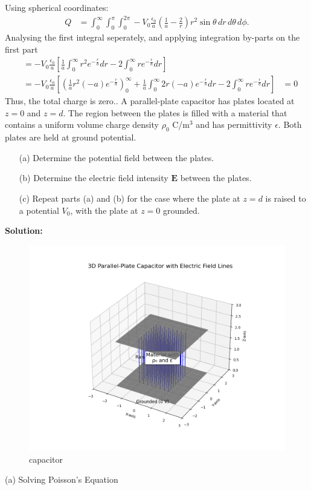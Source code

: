 \documentclass{article}
\begin{document}
Using spherical coordinates:
\begin{align*}
Q &= \int_{0}^{\infty} \int_{0}^{\pi} \int_{0}^{2\pi} -V_0 \frac{\epsilon_0}{a} 
\left( \frac{1}{a} - \frac{2}{r} \right) r^2 \sin\theta \, dr \, d\theta \, d\phi.
\end{align*}
Analysing the first integral seperately, and applying integration by-parts on the first part
\begin{align*}
&= -V_0 \frac{\epsilon_0}{a} 
\left[ 
    \frac{1}{a}\int_{0}^{\infty} r^2 e^{-\frac{r}{a}} dr 
    - 
    2\int_{0}^{\infty} r e^{-\frac{r}{a}} dr
\right] \\
&= -V_0 \frac{\epsilon_0}{a} 
\left[ \left( \frac{1}{a}r^2(-a) e^{-\frac{r}{a}}\right)_0^{\infty} +
    \frac{1}{a}\int_{0}^{\infty} 2r(-a) e^{-\frac{r}{a}} dr 
    - 
    2\int_{0}^{\infty} r e^{-\frac{r}{a}} dr
\right] 
&= 0
\end{align*}
Thus, the total charge is zero.\newline {}. A parallel-plate capacitor has plates located at $z = 0$ and $z = d$. The region between the plates is filled with a material that contains a uniform volume charge density $\rho_0$ C/m$^3$ and has permittivity $\epsilon$. Both plates are held at ground potential.
\begin{enumerate}
    \item[(a)] Determine the potential field between the plates.
    \item[(b)] Determine the electric field intensity $\mathbf{E}$ between the plates.
    \item[(c)] Repeat parts (a) and (b) for the case where the plate at $z = d$ is raised to a potential $V_0$, with the plate at $z = 0$ grounded.
\end{enumerate}
\textbf{Solution:}\newline
\begin{figure}[h!]
   \centering
   \includegraphics[width=1\columnwidth]{figs/q5.png}
    \caption{capacitor}
   \label{label}
\end{figure}(a) Solving Poisson's Equation
\end{document}
